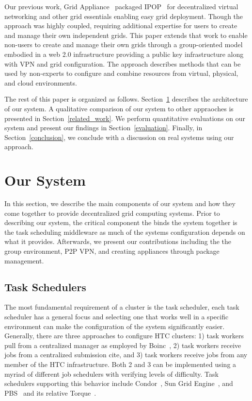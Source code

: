 \documentclass{sig-alternate}
\begin{document}
Our previous work, Grid Appliance~\cite{grid_appliance} packaged
IPOP~\cite{ipop} for decentralized virtual networking and other grid
essentials enabling easy grid deployment.  Though the approach was highly
coupled, requiring additional expertise for users to create and manage their
own independent grids.  This paper extends that work to enable non-users to
create and manage their own grids through a group-oriented model embodied in a
web 2.0 infrastructure providing a public key infrastructure along with VPN and
grid configuration.  The approach describes methods that can be used by
non-experts to configure and combine resources from virtual, physical, and
cloud environments.

The rest of this paper is organized as follows.  Section~\ref{our_system}
describes the architecture of our system.  A qualitative comparison of our
system to other appraoches is presented in Section~\ref{related_work}.  We
perform quantitative evaluations on our system and present our findings in
Section~\ref{evaluation}.  Finally, in Section~\ref{conclusion}, we conclude
with a discussion on real systems using our approach.

\section{Our System}
\label{our_system}
In this section, we describe the main components of our system and how they
come together to provide decentralized grid computing systems.  Prior to
describing our system, the critical component the binds the system together
is the task scheduling middleware as much of the systems configuration depends
on what it provides.  Afterwards, we present our contributions including the
the group environment, P2P VPN, and creating appliances through package
management.

\subsection{Task Schedulers}
The most fundamental requirement of a cluster is the task scheduler, each
task scheduler has a general focus and selecting one that works well in a
specific environment can make the configuration of the system significantly
easier.  Generally, there are three approaches to configure HTC clusters: 1)
task workers pull from a centralized manager as employed by Boinc~\cite{boinc},
2) task workers receive jobs from a centralized submission cite, and 3) task
workers receive jobs from any member of the HTC infrastructure.  Both 2 and 3
can be implemented using a myriad of different job schedulers with verifying
levels of difficulty.  Task schedulers supporting this behavior include
Condor~\cite{condor0}, Sun Grid Engine~\cite{grid_engine}, and PBS~\cite{pbs0,
pbs1} and its relative Torque~\cite{torque}.
\end{document}
